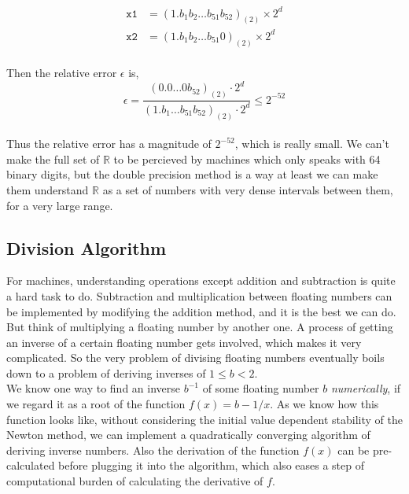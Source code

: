 \documentclass[paper=a4, fontsize=11pt]{scrartcl}
\begin{document}
\begin{equation}\nonumber
\begin{split}
	\texttt{x1} &= (1.b_1b_2\dots b_{51} b_{52})_{(2)} \times 2^d  \\
	\texttt{x2} &= (1.b_1b_2\dots b_{51} 0)_{(2)} \times 2^d
\end{split}
\end{equation}\\

Then the relative error $\epsilon$ is, \\

\begin{equation}\nonumber
	\epsilon = \frac{(0.0\dots0b_{52})_{(2)} \cdot 2^d}{(1.b_1\dots b_{51}b_{52})_{(2)} \cdot 2^d} \leq 2^{-52}
\end{equation}\\

Thus the relative error has a magnitude of $2^{-52}$, which is really small. We can't make the full set of $\mathbb{R}$ to be percieved by machines which only speaks with 64 binary digits, but the double precision method is a way at least we can make them understand $\mathbb{R}$ as a set of numbers with very dense intervals between them, for a very large range.

\vspace{0.15in}

\subsection{Division Algorithm}
\vspace{0.15in}

For machines, understanding operations except addition and subtraction is quite a hard task to do. Subtraction and multiplication  between floating numbers can be implemented by modifying the addition method, and it is the best we can do. But think of multiplying a floating number by another one.  A process of getting an inverse of a certain floating number gets involved, which makes it very complicated. So the very problem of divising floating numbers eventually boils down to a problem of deriving inverses of $1\leq b <2$. \\

We know one way to find an inverse $b^{-1}$ of some floating number $b$ \textit{numerically}, if we regard it as a root of the function $f(x)=b-1/x$. As we know how this function looks like, without considering the initial value dependent stability of the Newton method, we can implement a quadratically converging algorithm of deriving inverse numbers. Also the derivation of the function $f(x)$ can be pre-calculated before plugging it into the algorithm, which also eases a step of computational burden of calculating the derivative of $f$.\\
\end{document}
